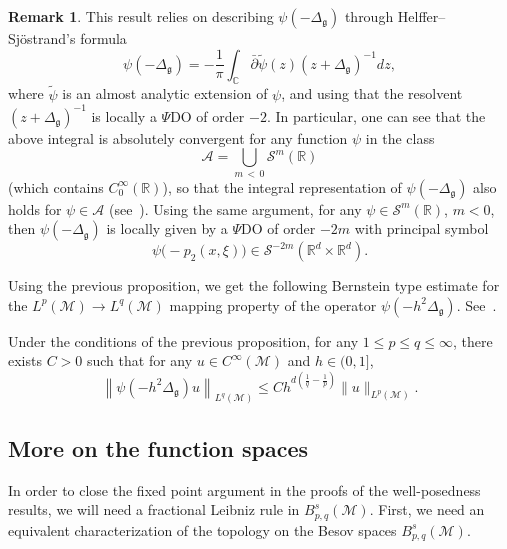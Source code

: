 \documentclass[10pt]{amsart}
\theoremstyle{definition}\newtheorem{defi}[theo]{Definition}\newtheorem{rema}[theo]{Remark}\newtheorem{exam}[theo]{Example}\newtheorem{exem}[theo]{Example}\newtheorem{nota}[theo]{Notation}
\newcommand{\R}{\mathbb{R}}
\newcommand{\C}{\mathbb{C}}
\newcommand{\A}{\mathcal{A}}
\renewcommand{\S}{\mathcal{S}}
\newcommand{\M}{\mathcal{M}}
\newcommand{\g}{\mathfrak{g}}
\newcommand{\Dlg}{\Delta_{\g}}
\begin{document}
\begin{rema}\label{rk-pdolocal}
This result relies on describing $\psi(-\Dlg)$ through Helffer--Sj\"ostr\-and's formula
\begin{equation*}
\psi(-\Dlg)=-\frac{1}{\pi}\int_{\C}\bar{\partial}\widetilde{\psi}(z) (z+\Dlg)^{-1}dz,
\end{equation*}
where $\widetilde{\psi}$ is an almost analytic extension of $\psi$, and using that the resolvent $(z+\Dlg)^{-1}$ is locally a $\Psi$DO of order $-2$. In particular, one can see that the above integral is absolutely convergent for any function $\psi$ in the class
\begin{equation*}
\A = \bigcup_{m\,<\,0}\S^m(\R)
\end{equation*}
(which contains $C_0^{\infty}(\R)$), so that the integral representation of $\psi(-\Dlg)$ also holds for $\psi\in\A$ (see~\cite[Chapter~2]{Davies}). Using the same argument, for any $\psi\in\S^m(\R)$, $m<0$, then $\psi(-\Dlg)$ is locally given by a $\Psi$DO of order $-2m$ with principal symbol
\begin{equation*}
\psi\big(-p_{2}(x,\xi)\big)\in\S^{-2m}\left(\R^d\times\R^d\right).
\end{equation*}
\end{rema}

Using the previous proposition, we get the following Bernstein type estimate for the $L^p(\M)\rightarrow L^q(\M)$ mapping property of the operator $\psi(-h^2\Dlg)$. See~\cite[Corollary~2.4]{BGT}.

\begin{coro}\label{lem-boundedness-psi-delta}
Under the conditions of the previous proposition, for any $1\leq p\leq q\leq \infty$, there exists $C>0$ such that for any $u\in C^{\infty}(\M)$ and $h\in (0,1]$,
\begin{equation*}
\left\|\psi\left(-h^2\Dlg\right)u\right\|_{L^q(\M)}\le C h^{d\left(\frac{1}{q}-\frac{1}{p}\right)}\|u\|_{L^p(\M)}.
\end{equation*}
\end{coro}


\subsection{More on the function spaces}
In order to close the fixed point argument in the proofs of the well-posedness results, we will need a fractional Leibniz rule in $B^s_{p,q}(\M)$. First, we need an equivalent characterization of the topology on the Besov spaces $B^s_{p,q}(\M)$.
\end{document}
